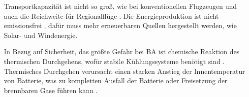 Transportkapazität ist nicht so groß, wie bei konventionellen Flugzeugen und auch die Reichweite für Regionalflüge \cite{abrantes2024impact}.
Die Energieproduktion ist nicht emissionsfrei \cite{abrantes2024impact}, dafür muss mehr erneuerbaren Quellen hergestellt werden, 
wie Solar- und Windenergie. 

In Bezug auf Sicherheit, das größte Gefahr bei BA ist chemische Reaktion des thermischen Durchgehens, wofür stabile
Kühlungssysteme benötigt sind \cite{donckers2024electric}. Thermisches Durchgehen verursacht einen starken Anstieg der 
Innentemperatur von Batterie, was zu kompletten Ausfall der Batterie oder Freisetzung der brennbaren Gase führen kann \cite{shahid2022review}.
